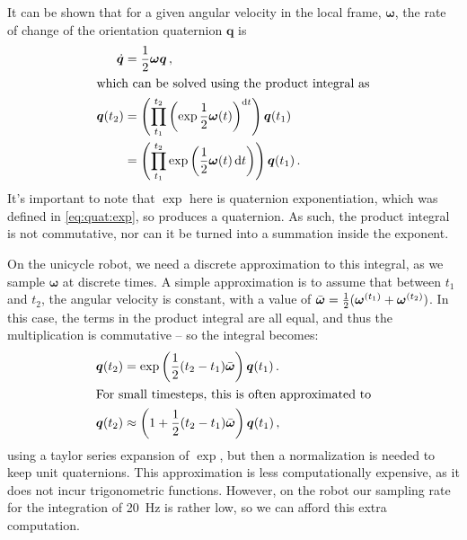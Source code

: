 \documentclass[main.tex]{subfiles}
\begin{document}
	It can be shown that for a given angular velocity in the local frame, $\bm{\omega}$, the rate of change of the orientation quaternion $\bm{q}$ is~\cite[p.~10]{boyle2016integration}
	\begin{align}
		\dot{\bm{q}} &= \frac{1}{2}\bm{\omega}\bm{q}\,, \\
	\intertext{which can be solved using the product integral as}
		\bm{q}(t_2)
			&= \left(\prod_{t_1}^{t_2} \left(\exp {\frac{1}{2}\bm{\omega}(t)}\right)^{\mathop{}\!\mathrm{d} t}\right) \bm{q}(t_1) \\
			&= \left(\prod_{t_1}^{t_2} \exp \left({\frac{1}{2}\bm{\omega}(t)} \mathop{}\!\mathrm{d} t\right)\right) \bm{q}(t_1)\,.
	\end{align}
	It's important to note that $\exp$ here is quaternion exponentiation, which was defined in \cref{eq:quat:exp}, so produces a quaternion.
	As such, the product integral is not commutative, nor can it be turned into a summation inside the exponent.

	On the unicycle robot, we need a discrete approximation to this integral, as we sample $\bm{\omega}$ at discrete times.
	A simple approximation is to assume that between $t_1$ and $t_2$, the angular velocity is constant, with a value of $\bar{\bm{\omega}} = \frac{1}{2}(\bm{\omega}^{(t_1)} + \bm{\omega}^{(t_2)})$.
	In this case, the terms in the product integral are all equal, and thus the multiplication is commutative -- so the integral becomes:
	\begin{align}
		\bm{q}(t_2)
			&= \exp \left(
				\frac{1}{2} (t_2 - t_1) \bar{\bm{\omega}}
			\right) \bm{q}(t_1)\,.
		\\
	\intertext{For small timesteps, this is often approximated to}
		\bm{q}(t_2)
			&\approx \left(1 + \frac{1}{2} (t_2 - t_1) \bar{\bm{\omega}}\right) \bm{q}(t_1)\,,
	\end{align}
	using a taylor series expansion of $\exp$, but then a normalization is needed to keep unit quaternions.
	This approximation is less computationally expensive, as it does not incur trigonometric functions.
	However, on the robot our sampling rate for the integration of \SI{20}{\hertz} is rather low, so we can afford this extra computation.

\bib
\end{document}
